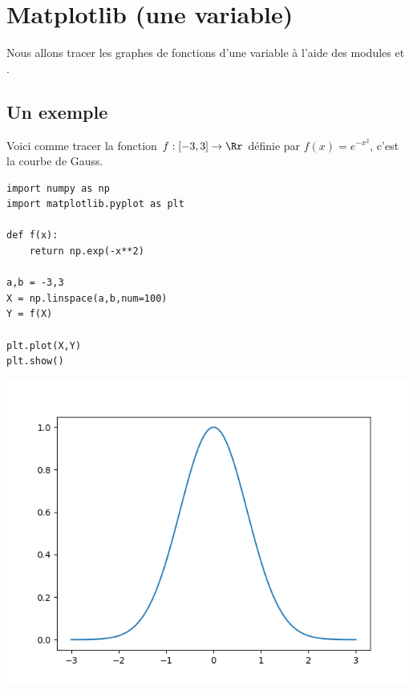 \documentclass[11pt,class=report,crop=false]{standalone}
\begin{document}
\section{Matplotlib (une variable)}

Nous allons tracer les graphes de fonctions d'une variable à l'aide des modules \matplotlib{} et \numpy{}.

\subsection{Un exemple}

Voici comme tracer la fonction $f : [-3,3] \to \Rr$ définie par $f(x) =e^{-x^2}$, c'est la courbe de Gauss.

\begin{minipage}{0.4\textwidth}
\begin{lstlisting}
import numpy as np
import matplotlib.pyplot as plt

def f(x):
	return np.exp(-x**2)

a,b = -3,3
X = np.linspace(a,b,num=100)
Y = f(X)

plt.plot(X,Y)
plt.show()
\end{lstlisting}
\end{minipage}
\begin{minipage}{0.49\textwidth}
\begin{center}
\includegraphics[scale=\myscale,scale=0.55]{figures/pythonx-gauss}
\end{center}
\end{minipage}
\end{document}
